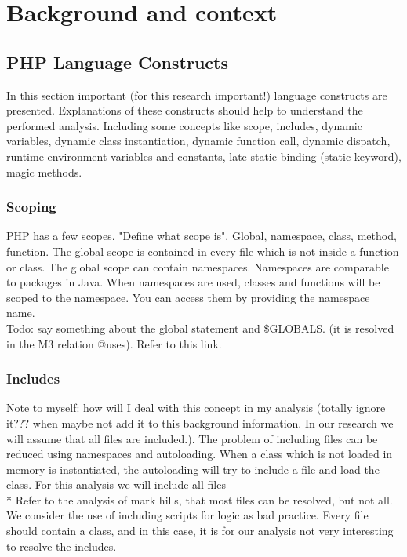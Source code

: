 \documentclass[../main.tex]{subfiles}
\begin{document}
    \chapter{Background and context}\label{chap:background}
    
    \section{PHP Language Constructs}
    In this section important (for this research important!) language constructs are presented.
    Explanations of these constructs should help to understand the performed analysis.
    Including some concepts like scope, includes, dynamic variables, dynamic class instantiation, dynamic function call, dynamic dispatch, runtime environment variables and constants, late static binding (static keyword), magic methods.
    
    \subsection{Scoping}
    PHP has a few scopes. "Define what scope is".
    Global, namespace, class, method, function.
    The global scope is contained in every file which is not inside a function or class.
    The global scope can contain namespaces.
    Namespaces are comparable to packages in Java.
    When namespaces are used, classes and functions will be scoped to the namespace.
    You can access them by providing the namespace name.
    \\
    Todo: say something about the global statement and \$GLOBALS. (it is resolved in the M3 relation @uses). Refer to this link\footnotemark.
    
    \subsection{Includes}
    Note to myself: how will I deal with this concept in my analysis (totally ignore it??? when maybe not add it to this background information. In our research we will assume that all files are included.).
    The problem of including files can be reduced using namespaces and autoloading.
    When a class which is not loaded in memory is instantiated, the autoloading will try to include a file and load the class. 
    For this analysis we will include all files 
    \\
    * Refer to the analysis of mark hills, that most files can be resolved, but not all. 
    We consider the use of including scripts for logic as bad practice. 
    Every file should contain a class, and in this case, it is for our analysis not very interesting to resolve the includes.
    
\end{document}
